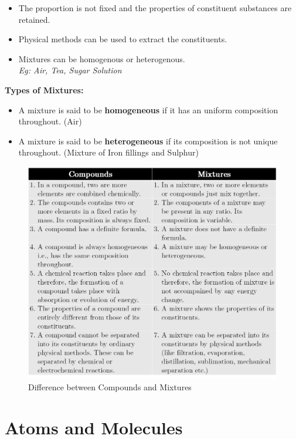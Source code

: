 \documentclass[
  14pt,
]{extarticle}
\providecommand{\tightlist}{%
  \setlength{\itemsep}{0pt}\setlength{\parskip}{0pt}}
\begin{document}
\begin{itemize}
\tightlist
\item
  The proportion is not fixed and the properties of constituent
  substances are retained.
\item
  Physical methods can be used to extract the constituents.
\item
  Mixtures can be homogenous or heterogenous.\\
  \emph{Eg: Air, Tea, Sugar Solution}
\end{itemize}

\textbf{Types of Mixtures:}

\begin{itemize}
\tightlist
\item
  A mixture is said to be \textbf{homogeneous} if it has an uniform
  composition throughout. (Air)
\item
  A mixture is said to be \textbf{heterogeneous} if its composition is
  not unique throughout. (Mixture of Iron fillings and Sulphur)
\end{itemize}

\begin{figure}
\centering
\includegraphics{./images/2022-06-12-15-51-27.png}
\caption{Difference between Compounds and Mixtures}
\end{figure}

\hypertarget{atoms-and-molecules}{%
\section{Atoms and Molecules}\label{atoms-and-molecules}}
\end{document}
